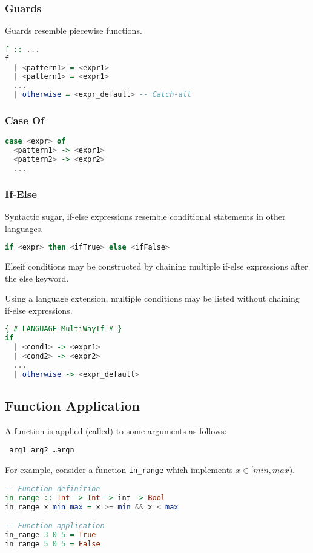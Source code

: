 \subsubsection{Guards}
Guards resemble piecewise functions.
\begin{lstlisting}[language=haskell]
f :: ...
f
  | <pattern1> = <expr1>
  | <pattern1> = <expr1>
  ...
  | otherwise = <expr_default> -- Catch-all
\end{lstlisting}

\subsubsection{Case Of}
\begin{lstlisting}[language=haskell]
case <expr> of
  <pattern1> -> <expr1>
  <pattern2> -> <expr2>
  ...
\end{lstlisting}

\subsubsection{If-Else}
Syntactic sugar, if-else expressions resemble conditional statements in other languages.
\begin{lstlisting}[language=haskell]
if <expr> then <ifTrue> else <ifFalse>
\end{lstlisting}
Elseif conditions may be constructed by chaining multiple if-else expressions after the else keyword.

Using a language extension, multiple conditions may be listed without chaining if-else expressions.
\begin{lstlisting}[language=haskell]
{-# LANGUAGE MultiWayIf #-}
if
  | <cond1> -> <expr1>
  | <cond2> -> <expr2>
  ...
  | otherwise -> <expr_default>
\end{lstlisting}

\subsection{Function Application}

A function is applied (called) to some arguments as follows:

\begin{center}
  \texttt{ arg1 arg2 \ldots argn}
\end{center}

For example, consider a function \texttt{in\_range} which implements $x \in [min, max)$.
\begin{lstlisting}[language=haskell]
-- Function definition
in_range :: Int -> Int -> int -> Bool
in_range x min max = x >= min && x < max

-- Function application
in_range 3 0 5 = True
in_range 5 0 5 = False
\end{lstlisting}

